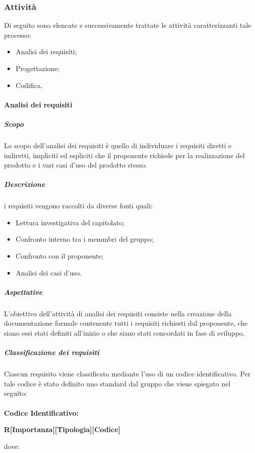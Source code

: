     \subsubsection{Attività}
    Di seguito sono elencate e successivamente trattate le attività caratterizzanti tale processo:
    \begin{itemize}
        \item Analisi dei requisiti;
        \item Progettazione;
        \item Codifica.
    \end{itemize}
    
    \paragraph{Analisi dei requisiti}
        \subparagraph{Scopo}
        Lo scopo dell’analisi dei requisiti è quello di individuare i requisiti diretti e indiretti, impliciti ed espliciti che il proponente richiede 
        per la realizzazione del prodotto e i vari casi d'uso del prodotto stesso.
    
        \subparagraph{Descrizione}
        i requisiti vengono raccolti da diverse fonti quali:
       \begin{itemize}
           \item Lettura investigativa del capitolato;
           \item Confronto interno tra i memmbri del gruppo;
           \item Confronto con il proponente;
           \item Analisi dei casi d'uso.
       \end{itemize}

        \subparagraph{Aspettative}
        L’obiettivo dell’attività di analisi dei requisiti consiste nella creazione della documentazione formale contenente tutti i requisiti 
        richiesti dal proponente, che siano essi stati definiti all'inizio o che siano stati concordati in fase di sviluppo.

        \subparagraph{Classificazione dei requisiti}
        Ciascun requisito viene classificato mediante l'uso di un codice identificativo. Per tale codice è stato definito uno standard dal gruppo che viene spiegato nel seguito:\\\\
        \textbf{Codice Identificativo:}\\
        \begin{center}
            \textbf{\LARGE{R[Importanza][Tipologia][Codice]}}
        \end{center}
        dove:

